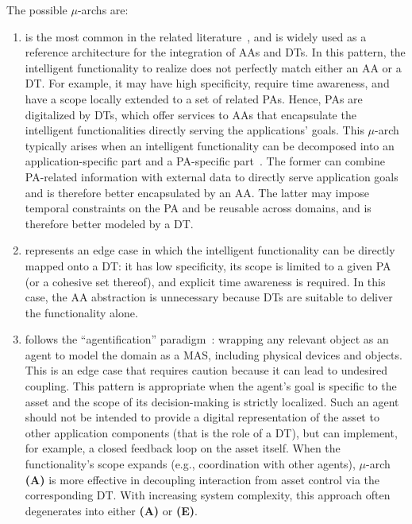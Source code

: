 The possible $\mu$-archs are: 
%
\begin{enumerate}[label=\textbf{(\Alph*)}]
    \item is the most common in the related literature~\cite{Mariani_Picone_Ricci_2022,Mariani_Picone_Ricci_2023,web-of-dt-ricci-2022}, and is widely used as a reference architecture for the integration of AAs and DTs. 
    In this pattern, the intelligent functionality to realize does not perfectly match either an AA or a DT. 
    For example, it may have high specificity, require time awareness, and have a scope locally extended to a set of related PAs. 
    Hence, PAs are digitalized by DTs, which offer services to AAs that encapsulate the intelligent functionalities directly serving the applications' goals. 
    This $\mu$-arch typically arises when an intelligent functionality can be decomposed into an application-specific part and a PA-specific part~\cite{Mariani_Picone_Ricci_2022}. 
    The former can combine PA-related information with external data to directly serve application goals and is therefore better encapsulated by an AA. 
    The latter may impose temporal constraints on the PA and be reusable across domains, and is therefore better modeled by a DT. 


    \item represents an edge case in which the intelligent functionality can be directly mapped onto a DT: it has low specificity, its scope is limited to a given PA (or a cohesive set thereof), and explicit time awareness is required. 
    In this case, the AA abstraction is unnecessary because DTs are suitable to deliver the functionality alone. 


    \item  follows the ``agentification'' paradigm~\cite{PicoValencia2018,Savaglio2020}: wrapping any relevant object as an agent to model the domain as a \ac{MAS}, including physical devices and objects. 
    This is an edge case that requires caution because it can lead to undesired coupling. 
    This pattern is appropriate when the agent's goal is specific to the asset and the scope of its decision-making is strictly localized. 
    Such an agent should not be intended to provide a digital representation of the asset to other application components (that is the role of a DT), but can implement, for example, a closed feedback loop on the asset itself. 
    When the functionality's scope expands (e.g., coordination with other agents), $\mu$-arch \textbf{(A)} is more effective in decoupling interaction from asset control via the corresponding DT. 
    With increasing system complexity, this approach often degenerates into either \textbf{(A)} or \textbf{(E)}.


\end{enumerate}
